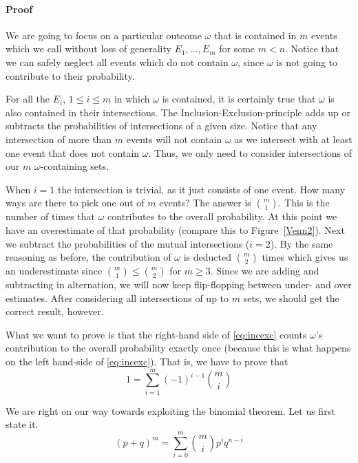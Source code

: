 \paragraph{Proof} We are going to focus on a particular outcome $ \omega $ that is contained in $ m $ events 
which we call without loss of generality $ E_{1}, \ldots, E_{m} $ for some $ m < n $. 
Notice that we can safely neglect all events which do not contain
$ \omega $, since $ \omega $ is not going to contribute to their probability. 

For all the $ E_{i} $, $ 1 \leq i \leq m $ in which $ \omega $ is contained, it is certainly true
that $ \omega $ is also contained in their intersections. The Inclusion-Exclusion-principle
adds up or subtracts the probabilities of intersections of a given size. Notice that any intersection of more
than $ m $ events will not contain $ \omega $ as we intersect with at least one event that does not
contain $ \omega $. Thus, we only need to consider intersections of our $ m $ $ \omega $-containing
sets.

When $ i = 1 $ the intersection is trivial, as it just consists of one event. How many ways are there to pick
one out of $ m $ events? The answer is $ \binom{m}{1} $. This is the number of times that $ \omega $
contributes to the overall probability. At this point we have an overestimate of that probability 
(compare this to Figure~\ref{Venn2}). 
Next we subtract the probabilities of the mutual intersections ($ i = 2 $).
By the same reasoning as before, the contribution of $ \omega $ is deducted $ \binom{m}{2} $ times
which gives us an underestimate since $ \binom{m}{1} \leq \binom{m}{2} $ for $ m \geq 3 $. Since we
are adding and subtracting in alternation, we will now keep flip-flopping between under- and over
estimates. After considering all intersections of up to $ m $ sets, we should get the correct result,
however.

What we want to prove is that the right-hand side of \eqref{eq:incexc} counts $ \omega $'s contribution 
to the overall probability exactly once (because this is what happens on the left hand-side of \eqref{eq:incexc}).
That is, we have to prove that
\begin{equation} \label{InExProofStep1}
1 = \underset{i=1}{\overset{m}{\sum}}(-1)^{i-1}\binom{m}{i}
\end{equation}

We are right on our way towards exploiting the binomial theorem. Let us first state it.
\begin{equation} \label{binomTheorem}
(p + q)^{m} = \underset{i=0}{\overset{m}{\sum}} \binom{m}{i} p^{i}q^{n-i} 
\end{equation}

